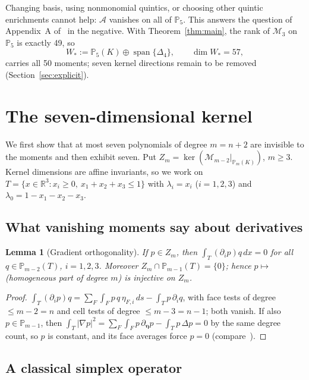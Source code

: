 \documentclass[11pt,a4paper]{article}
\newtheorem{lemma}[theorem]{Lemma}
\theoremstyle{definition}
\theoremstyle{remark}
\newcommand{\M}{\mathcal M}
\newcommand{\Pol}{\mathbb P}
\begin{document}
Changing basis, using nonmonomial quintics, or choosing other quintic
enrichments cannot help: \(\mathcal A\) vanishes on all of \(\Pol_5\).
This answers the question of Appendix~A of~\cite{BAJO2025} in the
negative. With Theorem~\ref{thm:main}, the rank of \(\M_3\) on \(\Pol_5\)
is exactly 49, so
\begin{equation}
 W_*:=\Pol_5(K)\oplus\operatorname{span}\{\Delta_4\},\qquad\dim W_*=57,
 \label{eq:Wstar}
\end{equation}
carries all 50 moments; seven kernel directions remain to be removed
(Section~\ref{sec:explicit}).

\section{The seven-dimensional kernel}
\label{sec:kernel}

We first show that at most seven polynomials of degree \(m=n+2\) are
invisible to the moments and then exhibit seven. Put
\(Z_m=\ker(\M_{m-2}|_{\Pol_m(K)})\), \(m\ge3\). Kernel dimensions are
affine invariants, so we work on
\(T=\{x\in\mathbb R^3:x_i\ge0,\ x_1+x_2+x_3\le1\}\) with \(\lambda_i=x_i\)
(\(i=1,2,3\)) and \(\lambda_0=1-x_1-x_2-x_3\).

\subsection{What vanishing moments say about derivatives}

\begin{lemma}[Gradient orthogonality]
\label{lem:gradient}
If \(p\in Z_m\), then \(\int_T(\partial_ip)q\,dx=0\) for all
\(q\in\Pol_{m-2}(T)\), \(i=1,2,3\). Moreover \(Z_m\cap\Pol_{m-1}(T)=\{0\}\);
hence \(p\mapsto\) (homogeneous part of degree \(m\)) is injective on \(Z_m\).
\end{lemma}

\begin{proof}
\(\int_T(\partial_ip)q=\sum_F\int_Fp\,q\,\eta_{F,i}\,ds-\int_Tp\,\partial_iq\),
with face tests of degree \(\le m-2=n\) and cell tests of degree
\(\le m-3=n-1\); both vanish. If also \(p\in\Pol_{m-1}\), then
\(\int_T|\nabla p|^2=\sum_F\int_Fp\,\partial_{\boldsymbol\eta}p-\int_Tp\,\Delta p=0\)
by the same degree count, so \(p\) is constant, and its face averages force
\(p=0\) (compare~\cite[Thm.~3.1]{YZ2021}).
\end{proof}

\subsection{A classical simplex operator}
\end{document}

